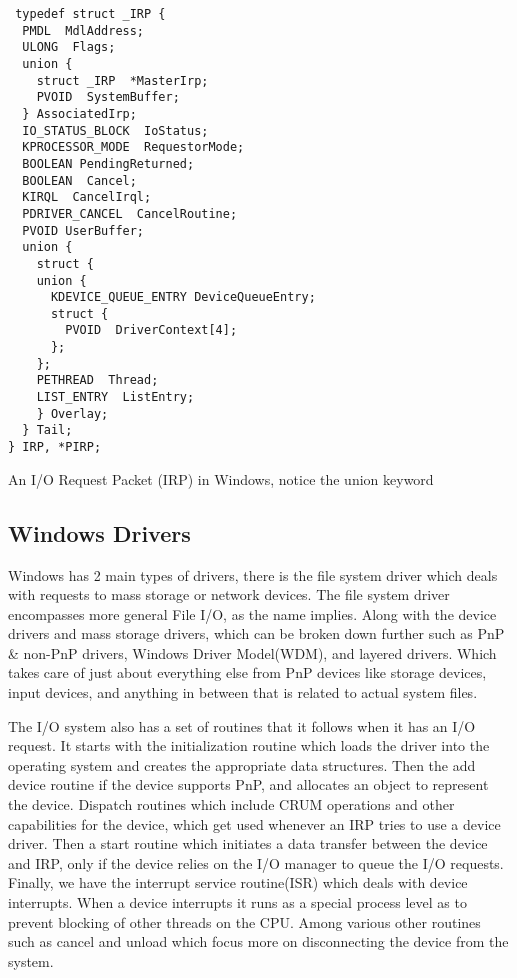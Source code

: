 \documentclass[10pt,conference,draftclsnofoot,onecolumn]{IEEEtran}
\begin{document}
 \begin{lstlisting}
 typedef struct _IRP {
  PMDL  MdlAddress;
  ULONG  Flags;
  union {
    struct _IRP  *MasterIrp;
    PVOID  SystemBuffer;
  } AssociatedIrp;
  IO_STATUS_BLOCK  IoStatus;
  KPROCESSOR_MODE  RequestorMode;
  BOOLEAN PendingReturned;
  BOOLEAN  Cancel;
  KIRQL  CancelIrql;
  PDRIVER_CANCEL  CancelRoutine;
  PVOID UserBuffer;
  union {
    struct {
    union {
      KDEVICE_QUEUE_ENTRY DeviceQueueEntry;
      struct {
        PVOID  DriverContext[4];
      };
    };
    PETHREAD  Thread;
    LIST_ENTRY  ListEntry;
    } Overlay;
  } Tail;
} IRP, *PIRP;
\end{lstlisting}
\center An I/O Request Packet (IRP) in Windows, notice the union keyword \newline


\subsection{Windows Drivers}
    Windows has 2 main types of drivers, there is the file system driver which deals with requests to mass storage or network devices. The file system driver encompasses more general File I/O, as the name implies. Along with the device drivers and mass storage drivers, which can be broken down further such as PnP \& non-PnP drivers, Windows Driver Model(WDM), and layered drivers. Which takes care of just about everything else from PnP devices like storage devices, input devices, and anything in between that is related to actual system files.

The I/O system also has a set of routines that it follows when it has an I/O request. It starts with the initialization routine which loads the driver into the operating system and creates the appropriate data structures. Then the add device routine if the device supports PnP, and allocates an object to represent the device. Dispatch routines which include CRUM operations and other capabilities for the device, which get used whenever an IRP tries to use a device driver. Then a start routine which initiates a data transfer between the device and IRP, only if the device relies on the I/O manager to queue the I/O requests. Finally, we have the interrupt service routine(ISR) which deals with device interrupts. When a device interrupts it runs as a special process level as to prevent blocking of other threads on the CPU. Among various other routines such as cancel and unload which focus more on disconnecting the device from the system.
\end{document}
